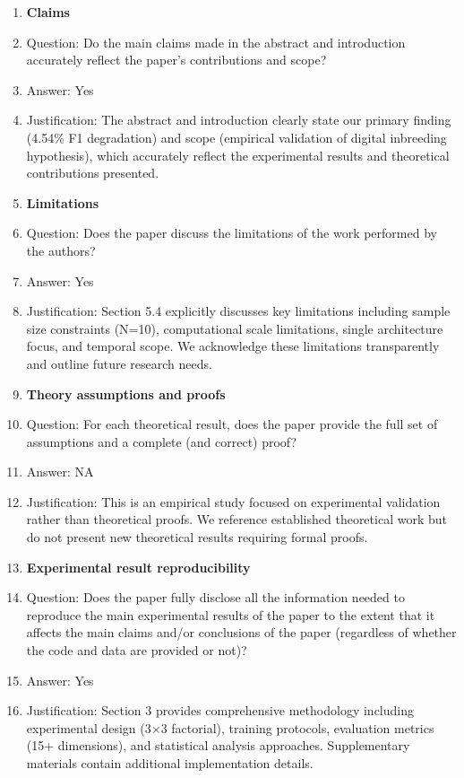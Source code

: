 \documentclass{article}
\begin{document}
\begin{enumerate}

\item {\bf Claims}
    \item[] Question: Do the main claims made in the abstract and introduction accurately reflect the paper's contributions and scope?
    \item[] Answer: Yes
    \item[] Justification: The abstract and introduction clearly state our primary finding (4.54\% F1 degradation) and scope (empirical validation of digital inbreeding hypothesis), which accurately reflect the experimental results and theoretical contributions presented.

\item {\bf Limitations}
    \item[] Question: Does the paper discuss the limitations of the work performed by the authors?
    \item[] Answer: Yes
    \item[] Justification: Section 5.4 explicitly discusses key limitations including sample size constraints (N=10), computational scale limitations, single architecture focus, and temporal scope. We acknowledge these limitations transparently and outline future research needs.

\item {\bf Theory assumptions and proofs}
    \item[] Question: For each theoretical result, does the paper provide the full set of assumptions and a complete (and correct) proof?
    \item[] Answer: NA
    \item[] Justification: This is an empirical study focused on experimental validation rather than theoretical proofs. We reference established theoretical work but do not present new theoretical results requiring formal proofs.

    \item {\bf Experimental result reproducibility}
    \item[] Question: Does the paper fully disclose all the information needed to reproduce the main experimental results of the paper to the extent that it affects the main claims and/or conclusions of the paper (regardless of whether the code and data are provided or not)?
    \item[] Answer: Yes
    \item[] Justification: Section 3 provides comprehensive methodology including experimental design (3×3 factorial), training protocols, evaluation metrics (15+ dimensions), and statistical analysis approaches. Supplementary materials contain additional implementation details.


\end{enumerate}
\end{document}
